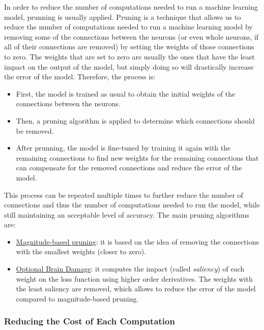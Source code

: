 In order to reduce the number of computations needed to run a machine learning model, prunning is usually applied.
Pruning is a technique that allows us to reduce the number of computations needed to run a machine learning model by removing some of the connections between the neurons (or even whole neurons, if all of their connections are removed) by setting the weights of those connections to zero. The weights that are set to zero are usually the ones that have the least impact on the output of the model, but simply doing so will drastically increase the error of the model. Therefore, the process is:
\begin{itemize}
    \item First, the model is trained as usual to obtain the initial weights of the connections between the neurons.
    \item Then, a pruning algorithm is applied to determine which connections should be removed.
    \item After prunning, the model is fine-tuned by training it again with the remaining connections to find new weights for the remaining connections that can compensate for the removed connections and reduce the error of the model.
\end{itemize}

This process can be repeated multiple times to further reduce the number of connections and thus the number of computations needed to run the model, while still maintaining an acceptable level of accuracy. The main pruning algorithms are:
\begin{itemize}
    \item \ul{Magnitude-based pruning}: it is based on the idea of removing the connections with the smallest weights (closer to zero).
    \item \ul{Optional Brain Damage}: it computes the impact (called \emph{saliency}) of each weight on the loss function using higher order derivatives. The weights with the least saliency are removed, which allows to reduce the error of the model compared to magnitude-based pruning.
\end{itemize}

\subsubsection{Reducing the Cost of Each Computation}

